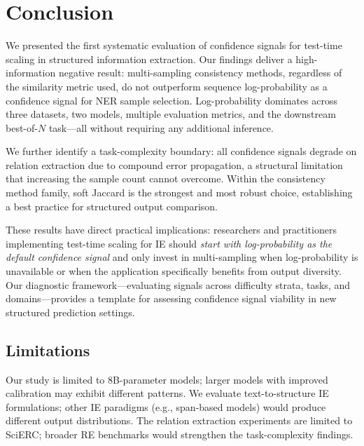 \documentclass[11pt,a4paper]{article}
\begin{document}
\section{Conclusion}

We presented the first systematic evaluation of confidence signals for test-time scaling in structured information extraction. Our findings deliver a high-information negative result: multi-sampling consistency methods, regardless of the similarity metric used, do not outperform sequence log-probability as a confidence signal for NER sample selection. Log-probability dominates across three datasets, two models, multiple evaluation metrics, and the downstream best-of-$N$ task---all without requiring any additional inference.

We further identify a task-complexity boundary: all confidence signals degrade on relation extraction due to compound error propagation, a structural limitation that increasing the sample count cannot overcome. Within the consistency method family, soft Jaccard is the strongest and most robust choice, establishing a best practice for structured output comparison.

These results have direct practical implications: researchers and practitioners implementing test-time scaling for IE should \emph{start with log-probability as the default confidence signal} and only invest in multi-sampling when log-probability is unavailable or when the application specifically benefits from output diversity. Our diagnostic framework---evaluating signals across difficulty strata, tasks, and domains---provides a template for assessing confidence signal viability in new structured prediction settings.

\subsection*{Limitations}

Our study is limited to 8B-parameter models; larger models with improved calibration may exhibit different patterns. We evaluate text-to-structure IE formulations; other IE paradigms (e.g., span-based models) would produce different output distributions. The relation extraction experiments are limited to SciERC; broader RE benchmarks would strengthen the task-complexity findings.
\end{document}
